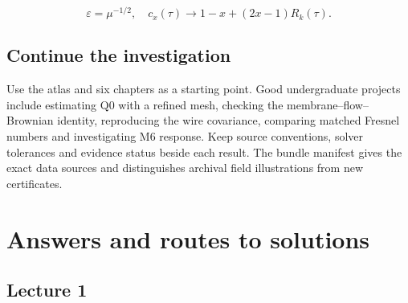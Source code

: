 \documentclass[11pt,oneside,openany]{book}
\begin{document}
\[\varepsilon=\mu^{-1/2},\quad c_x(\tau)\to1-x+(2x-1)R_k(\tau).\]


\section{Continue the investigation}\label{sec:slide102}

Use the atlas and six chapters as a starting point. Good undergraduate projects include estimating $\mathrm{Q0}$ with a refined mesh, checking the membrane--flow--Brownian identity, reproducing the wire covariance, comparing matched Fresnel numbers and investigating M6 response. Keep source conventions, solver tolerances and evidence status beside each result. The bundle manifest gives the exact data sources and distinguishes archival field illustrations from new certificates.


\chapter{Answers and routes to solutions}\label{app:answers}

\section{Lecture 1}
\end{document}

